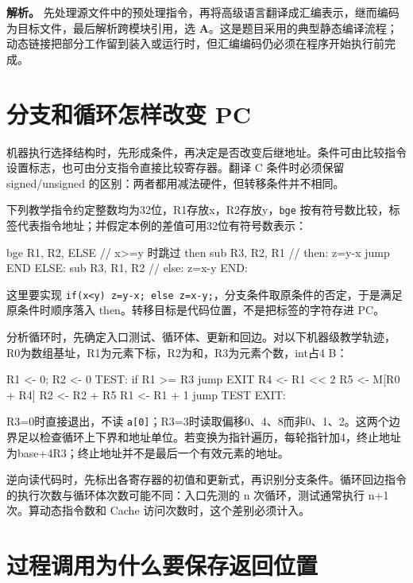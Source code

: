 \textbf{解析。} 先处理源文件中的预处理指令，再将高级语言翻译成汇编表示，继而编码为目标文件，最后解析跨模块引用，选 \textbf{A}。这是题目采用的典型静态编译流程；动态链接把部分工作留到装入或运行时，但汇编编码仍必须在程序开始执行前完成。

\section{分支和循环怎样改变 PC}\label{CO04-11}

机器执行选择结构时，先形成条件，再决定是否改变后继地址。条件可由比较指令设置标志，也可由分支指令直接比较寄存器。翻译 C 条件时必须保留 signed/unsigned 的区别：两者都用减法硬件，但转移条件并不相同。

下列教学指令约定整数均为32位，R1存放x，R2存放y，\texttt{bge} 按有符号数比较，标签代表指令地址；并假定本例的差值可用32位有符号数表示：

\begin{codeblock}[language={}]
    bge R1, R2, ELSE     // x>=y 时跳过 then
    sub R3, R2, R1      // then: z=y-x
    jump END
ELSE:
    sub R3, R1, R2      // else: z=x-y
END:
\end{codeblock}

这里要实现 \texttt{if(\allowbreak{}x<\allowbreak{}y)\allowbreak{} z=\allowbreak{}y-x;\allowbreak{} else z=\allowbreak{}x-y;\allowbreak{}}，分支条件取原条件的否定，于是满足原条件时顺序落入 then。转移目标是代码位置，不是把标签的字符存进 PC。

分析循环时，先确定入口测试、循环体、更新和回边。对以下机器级教学轨迹，R0为数组基址，R1为元素下标，R2为和，R3为元素个数，int占4 B：

\begin{codeblock}[language={}]
    R1 <- 0; R2 <- 0
TEST:
    if R1 >= R3 jump EXIT
    R4 <- R1 << 2
    R5 <- M[R0 + R4]
    R2 <- R2 + R5
    R1 <- R1 + 1
    jump TEST
EXIT:
\end{codeblock}

R3=0时直接退出，不读 \texttt{a[0]}；R3=3时读取偏移0、4、8而非0、1、2。这两个边界足以检查循环上下界和地址单位。若变换为指针遍历，每轮指针加4，终止地址为base+4R3；终止地址并不是最后一个有效元素的地址。

逆向读代码时，先标出各寄存器的初值和更新式，再识别分支条件。循环回边指令的执行次数与循环体次数可能不同：入口先测的 n 次循环，测试通常执行 n+1次。算动态指令数和 Cache 访问次数时，这个差别必须计入。

\section{过程调用为什么要保存返回位置}\label{CO04-12}

